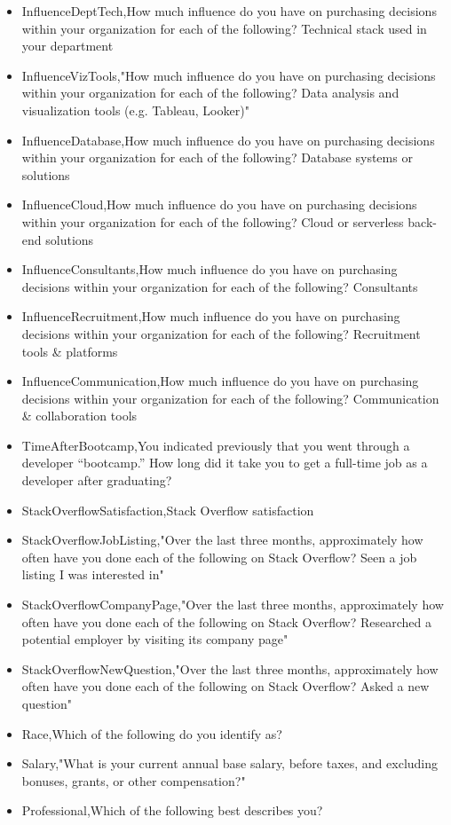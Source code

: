 \begin{appendices}
\begin{itemize}
        \item InfluenceDeptTech,How much influence do you have on purchasing decisions within your organization for each of the following? Technical stack used in your department
        \item InfluenceVizTools,"How much influence do you have on purchasing decisions within your organization for each of the following? Data analysis and visualization tools (e.g. Tableau, Looker)"
        \item InfluenceDatabase,How much influence do you have on purchasing decisions within your organization for each of the following? Database systems or solutions
        \item InfluenceCloud,How much influence do you have on purchasing decisions within your organization for each of the following? Cloud or serverless back-end solutions
        \item InfluenceConsultants,How much influence do you have on purchasing decisions within your organization for each of the following? Consultants
        \item InfluenceRecruitment,How much influence do you have on purchasing decisions within your organization for each of the following? Recruitment tools & platforms
        \item InfluenceCommunication,How much influence do you have on purchasing decisions within your organization for each of the following? Communication & collaboration tools
        \item TimeAfterBootcamp,You indicated previously that you went through a developer “bootcamp.” How long did it take you to get a full-time job as a developer after graduating?
        \item StackOverflowSatisfaction,Stack Overflow satisfaction
        \item StackOverflowJobListing,"Over the last three months, approximately how often have you done each of the following on Stack Overflow? Seen a job listing I was interested in"
        \item StackOverflowCompanyPage,"Over the last three months, approximately how often have you done each of the following on Stack Overflow? Researched a potential employer by visiting its company page"
        \item StackOverflowNewQuestion,"Over the last three months, approximately how often have you done each of the following on Stack Overflow? Asked a new question"
        \item Race,Which of the following do you identify as?
        \item Salary,"What is your current annual base salary, before taxes, and excluding bonuses, grants, or other compensation?"
        \item Professional,Which of the following best describes you?
    \end{itemize}



\end{appendices}
